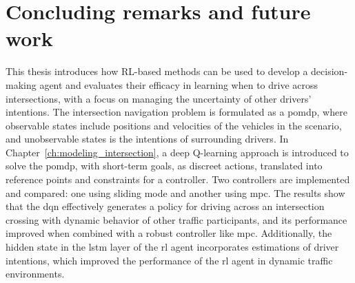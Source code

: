 \chapter{Concluding remarks and future work}
\label{ch:conclusion_fw}

This thesis introduces how RL-based methods can be used to develop a decision-making agent and evaluates their efficacy in learning when to drive across intersections, with a focus on managing the uncertainty of other drivers' intentions. The intersection navigation problem is formulated as a \gls{pomdp}, where observable states include positions and velocities of the vehicles in the scenario, and unobservable states is the intentions of surrounding drivers. 
In Chapter~\ref{ch:modeling_intersection}, a deep Q-learning approach is introduced to solve the \gls{pomdp}, with short-term goals, as discreet actions, translated into reference points and constraints for a controller. Two controllers are implemented and compared: one using sliding mode and another using \gls{mpc}. The results show that the \gls{dqn} effectively generates a policy for driving across an intersection crossing with dynamic behavior of other traffic participants, and its performance improved when combined with a robust controller like \gls{mpc}.  
Additionally, the hidden state in the \gls{lstm} layer of the \gls{rl} agent incorporates estimations of driver intentions, which improved the performance of the \gls{rl} agent in dynamic traffic environments.


